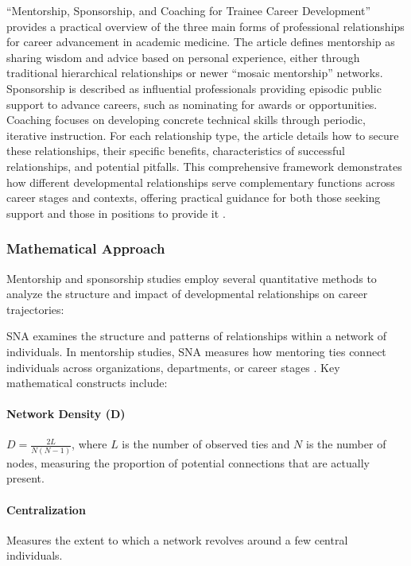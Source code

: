 \documentclass[main.tex]{subfiles}
\begin{document}
``Mentorship, Sponsorship, and Coaching for Trainee Career Development'' provides a practical overview of the three main forms of professional relationships for career advancement in academic medicine. The article defines mentorship as sharing wisdom and advice based on personal experience, either through traditional hierarchical relationships or newer ``mosaic mentorship'' networks. Sponsorship is described as influential professionals providing episodic public support to advance careers, such as nominating for awards or opportunities. Coaching focuses on developing concrete technical skills through periodic, iterative instruction. For each relationship type, the article details how to secure these relationships, their specific benefits, characteristics of successful relationships, and potential pitfalls. This comprehensive framework demonstrates how different developmental relationships serve complementary functions across career stages and contexts, offering practical guidance for both those seeking support and those in positions to provide it \cite{rsna2021mentorship}.

\subsubsection{Mathematical Approach}

Mentorship and sponsorship studies employ several quantitative methods to analyze the structure and impact of developmental relationships on career trajectories:

SNA examines the structure and patterns of relationships within a network of individuals. In mentorship studies, SNA measures how mentoring ties connect individuals across organizations, departments, or career stages \cite{cdc2015network}. Key mathematical constructs include:

\paragraph{Network Density (D)} \( D = \frac{2L}{N(N-1)} \), where \( L \) is the number of observed ties and \( N \) is the number of nodes, measuring the proportion of potential connections that are actually present.

\paragraph{Centralization} Measures the extent to which a network revolves around a few central individuals.
\end{document}

